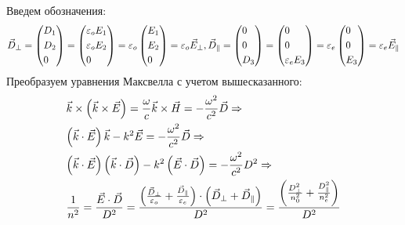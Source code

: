 \documentclass[a4paper,12pt]{article}
\begin{document}
Введем обозначения: 
\[{{\vec D}_ \bot } = \left( \begin{gathered}
{D_1} \hfill \\
{D_2} \hfill \\
0 \hfill \\ 
\end{gathered}  \right) = \left( \begin{gathered}
{\varepsilon _o}{E_1} \hfill \\
{\varepsilon _o}{E_2} \hfill \\
0 \hfill \\ 
\end{gathered}  \right) = {\varepsilon _o}\left( \begin{gathered}
{E_1} \hfill \\
{E_2} \hfill \\
0 \hfill \\ 
\end{gathered}  \right) = {\varepsilon _o}{{\vec E}_ \bot },{{\vec D}_\parallel } = \left( \begin{gathered}
0 \hfill \\
0 \hfill \\
{D_3} \hfill \\ 
\end{gathered}  \right) = \left( \begin{gathered}
0 \hfill \\
0 \hfill \\
{\varepsilon _e}{E_3} \hfill \\ 
\end{gathered}  \right) = {\varepsilon _e}\left( \begin{gathered}
0 \hfill \\
0 \hfill \\
{E_3} \hfill \\ 
\end{gathered}  \right) = {\varepsilon _e}{{\vec E}_\parallel }\]
Преобразуем уравнения Максвелла с учетом вышесказанного:
\[\begin{gathered}
\vec k \times \left( {\vec k \times \vec E} \right) = \frac{\omega }{c}\vec k \times \vec H =  - \frac{{{\omega ^2}}}{{{c^2}}}\vec D \Rightarrow  \hfill \\
\left( {\vec k \cdot \vec E} \right)\vec k - {k^2}\vec E =  - \frac{{{\omega ^2}}}{{{c^2}}}\vec D \Rightarrow  \hfill \\
\left( {\vec k \cdot \vec E} \right)\left( {\vec k \cdot \vec D} \right) - {k^2}\left( {\vec E \cdot \vec D} \right) =  - \frac{{{\omega ^2}}}{{{c^2}}}{D^2} \Rightarrow  \hfill \\
\frac{1}{{{n^2}}} = \frac{{\vec E \cdot \vec D}}{{{D^2}}} = \frac{{\left( {\frac{{{{\vec D}_ \bot }}}{{{\varepsilon _o}}} + \frac{{{{\vec D}_\parallel }}}{{{\varepsilon _e}}}} \right) \cdot \left( {{{\vec D}_ \bot } + {{\vec D}_\parallel }} \right)}}{{{D^2}}} = \frac{{\left( {\frac{{D_ \bot ^2}}{{n_0^2}} + \frac{{D_\parallel ^2}}{{n_e^2}}} \right)}}{{{D^2}}} \hfill \\ 
\end{gathered} \]
\end{document}
